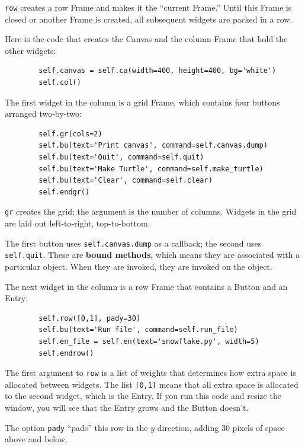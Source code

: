 \documentclass[10pt]{book}
\begin{document}
{\tt row} creates a row Frame and makes it the ``current Frame.''
Until this Frame is closed or another Frame is created, all
subsequent widgets are packed in a row.

Here is the code that creates the Canvas and the column Frame
that hold the other widgets:

\beforeverb
\begin{verbatim}
        self.canvas = self.ca(width=400, height=400, bg='white')
        self.col()
\end{verbatim}
\afterverb
%
The first widget in the column is a grid Frame, which contains
four buttons arranged two-by-two:

\beforeverb
\begin{verbatim}
        self.gr(cols=2)
        self.bu(text='Print canvas', command=self.canvas.dump)
        self.bu(text='Quit', command=self.quit)
        self.bu(text='Make Turtle', command=self.make_turtle)
        self.bu(text='Clear', command=self.clear)
        self.endgr()
\end{verbatim}
\afterverb
%
{\tt gr} creates the grid; the argument is the number of
columns.  Widgets in the grid are
laid out left-to-right, top-to-bottom.


The first button uses {\tt self.canvas.dump} as a callback; the second
uses {\tt self.quit}.  These are {\bf bound methods}, which means they
are associated with a particular object.  When they are invoked, they
are invoked on the object.

The next widget in the column is a row Frame that contains
a Button and an Entry:

\beforeverb
\begin{verbatim}
        self.row([0,1], pady=30)
        self.bu(text='Run file', command=self.run_file)
        self.en_file = self.en(text='snowflake.py', width=5)
        self.endrow()
\end{verbatim}
\afterverb
%
The first argument to {\tt row} is a list of weights that
determines how extra space is allocated between widgets.  
The list {\tt [0,1]} means that all extra space is allocated
to the second widget, which is the Entry.  If you run this code
and resize the window, you will see that the Entry grows and
the Button doesn't.

The option {\tt pady} ``pads'' this row in the $y$ direction,
adding 30 pixels of space above and below.
\end{document}
